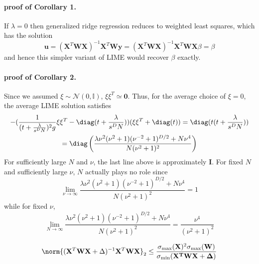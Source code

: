     \paragraph{proof of Corollary 1.}
            If $\lambda = 0$ then generalized ridge regression reduces to weighted least squares, which has the solution
            \begin{equation*}
                \mathbf{u}=(\mathbf{X}^T \mathbf{W} \mathbf{X})^{-1} \mathbf{X}^T \mathbf{W}\mathbf{y} = (\mathbf{X}^T \mathbf{W} \mathbf{X})^{-1} \mathbf{X}^T \mathbf{W} \mathbf{X}\beta = \beta
            \end{equation*}
            and hence this simpler variant of LIME would recover $\beta$ exactly.

   \paragraph{proof of Corollary 2.}
        Since we assumed $\xi \sim \mathcal{N}(0, \mathds{I})$,  $\xi \xi^T \simeq \mathbf{0}$. Thus, for the average choice of $\xi = 0$, the average LIME solution satisfies
        \begin{gather*}
            -(\frac{1}{(t + \frac{\lambda}{s^D N})^2g} \xi \xi^T - \diag(t + \frac{\lambda}{s^D N}))(\xi \xi^T + \diag(t)) = \diag(t(t + \frac{\lambda}{s^D N})) \\
            = \diag\left(\frac{\lambda \nu^2(\nu^2 + 1)(\nu^{-2} + 1)^{D/2} + N\nu^4}{N(\nu^2 + 1)^2}\right)
        \end{gather*}   
        For sufficiently large $N$ and $\nu$, the last line above is approximately $\mathbf{I}$. For fixed $N$ and sufficiently large $\nu$, $N$ actually plays no role since
        \begin{equation*}
            \lim_{\nu \rightarrow \infty} \frac{\lambda \nu^2(\nu^2 + 1)(\nu^{-2} + 1)^{D/2} + N\nu^4}{N(\nu^2 + 1)^2} = 1
        \end{equation*}
        while for fixed $\nu$,
        \begin{equation*}
            \lim_{N \rightarrow \infty} \frac{\lambda \nu^2(\nu^2 + 1)(\nu^{-2} + 1)^{D/2} + N\nu^4}{N(\nu^2 + 1)^2} = \frac{\nu^4}{(\nu^2 + 1)^2}
        \end{equation*}
 


    \begin{lemma}
        \[\norm{(\mathbf{X}^T \mathbf{W} \mathbf{X} + \Delta)^{-1} \mathbf{X}^T \mathbf{W} \mathbf{X}}_2 \leq \frac{\sigma_{\max}(\mathbf{X})^2 \sigma_{\max}(\mathbf{W})}{\sigma_{\min}(\mathbf{\mathbf{X}^T \mathbf{W} \mathbf{X} + \Delta})}\]
    \end{lemma}
